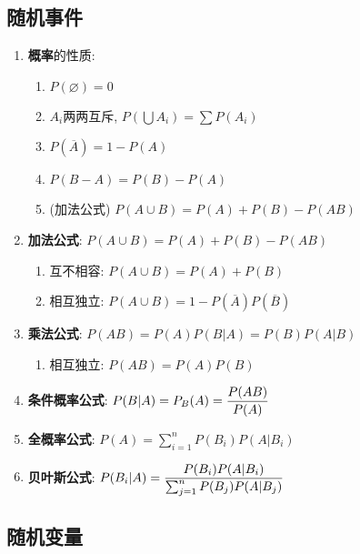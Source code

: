\subsection{随机事件}

\begin{enumerate}
\item {\bf 概率}的性质: 
\begin{enumerate}
\item $P(\varnothing)=0$
\item $A_i$两两互斥, $P(\bigcup{A_i})=\sum{P(A_i)}$
\item $P(\overline{A})=1-P(A)$
\item $P(B-A)=P(B)-P(A)$
\item (加法公式) $P(A\cup B)=P(A)+P(B)-P(AB)$
\end{enumerate}

\item {\bf 加法公式}: $P(A\cup B)=P(A)+P(B)-P(AB)$
\begin{enumerate}
\item 互不相容: $P(A\cup B)=P(A)+P(B)$
\item 相互独立: $P(A\cup B)=1-P(\overline{A})P(\overline{B})$
\end{enumerate}

\item {\bf 乘法公式}: $P(AB)=P(A)P(B|A)=P(B)P(A|B)$
\begin{enumerate}
\item 相互独立: $P(AB)=P(A)P(B)$
\end{enumerate}
\item {\bf 条件概率公式}: $P(B|A)=P_B(A)=\displaystyle\frac{P(AB)}{P(A)}$
\item {\bf 全概率公式}: $P(A)=\sum_{i=1}^{n}{P(B_i)P(A|B_i)}$
\item {\bf 贝叶斯公式}: $P(B_i|A)=\displaystyle\frac{P(B_i)P(A|B_i)}{\sum_{j=1}^{n}{P(B_j)P(A|B_j)}}$

\end{enumerate}

\subsection{随机变量}

